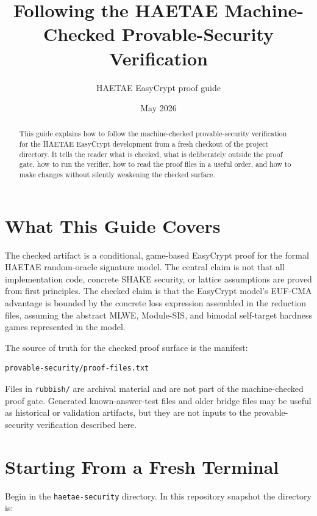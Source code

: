 \documentclass[11pt]{article}
\title{Following the HAETAE Machine-Checked Provable-Security Verification}
\author{HAETAE EasyCrypt proof guide}
\date{May 2026}
\newcommand{\file}[1]{\nolinkurl{#1}}
\newcommand{\eufcma}{EUF-CMA}
\begin{document}
\maketitle

\begin{abstract}
This guide explains how to follow the machine-checked provable-security
verification for the HAETAE EasyCrypt development from a fresh checkout of the
project directory.  It tells the reader what is checked, what is deliberately
outside the proof gate, how to run the verifier, how to read the proof files in
a useful order, and how to make changes without silently weakening the checked
surface.
\end{abstract}

\tableofcontents

\section{What This Guide Covers}

The checked artifact is a conditional, game-based EasyCrypt proof for the
formal HAETAE random-oracle signature model.  The central claim is not that all
implementation code, concrete SHAKE security, or lattice assumptions are proved
from first principles.  The checked claim is that the EasyCrypt model's
\eufcma{} advantage is bounded by the concrete loss expression assembled in the
reduction files, assuming the abstract MLWE, Module-SIS, and bimodal
self-target hardness games represented in the model.

The source of truth for the checked proof surface is the manifest:

\begin{lstlisting}[language=bash]
provable-security/proof-files.txt
\end{lstlisting}

Files in \file{rubbish/} are archival material and are not part of the
machine-checked proof gate.  Generated known-answer-test files and older bridge
files may be useful as historical or validation artifacts, but they are not
inputs to the provable-security verification described here.

\section{Starting From a Fresh Terminal}

Begin in the \file{haetae-security} directory.  In this repository snapshot the
directory is:
\end{document}
